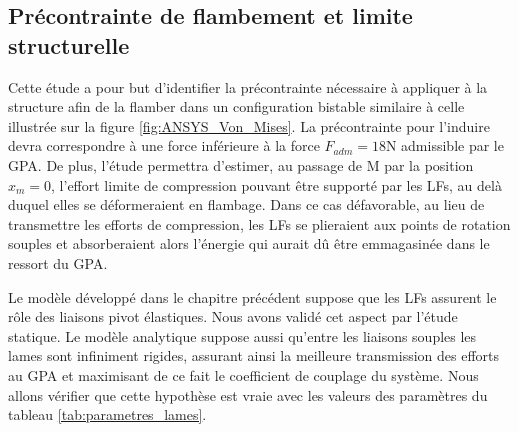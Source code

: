 	\subsection{Précontrainte de flambement et limite structurelle}
	\label{sec:3.3.1b_Limite structurelle et précontrainte de flambement}
Cette étude a pour but d'identifier la précontrainte nécessaire à appliquer à la structure afin de la flamber dans un configuration bistable similaire à celle illustrée sur la figure \ref{fig:ANSYS_Von_Mises}. La précontrainte pour l'induire devra correspondre à une force inférieure à la force $F_{adm}=18$N admissible par le GPA. De plus, l'étude permettra d'estimer, au passage de M par la position $x_m=0$, l'effort limite de compression pouvant être supporté par les LFs, au delà duquel elles se déformeraient en flambage. Dans ce cas défavorable, au lieu de transmettre les efforts de compression, les LFs se plieraient aux points de rotation souples et absorberaient alors l'énergie qui aurait dû être emmagasinée dans le ressort du GPA.

Le modèle développé dans le chapitre précédent suppose que les LFs assurent le rôle des liaisons pivot élastiques. Nous avons validé cet aspect par l'étude statique. Le modèle analytique suppose aussi qu'entre les liaisons souples les lames sont infiniment rigides, assurant ainsi la meilleure transmission des efforts au GPA et maximisant de ce fait le coefficient de couplage du système. Nous allons vérifier que cette hypothèse est vraie avec les valeurs des paramètres du tableau \ref{tab:parametres_lames}.

